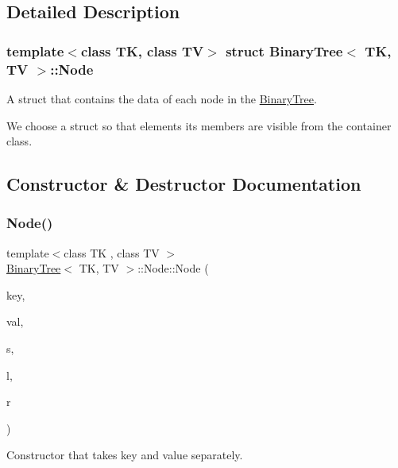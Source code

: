 \subsection{Detailed Description}
\subsubsection*{template$<$class TK, class TV$>$\newline
struct Binary\+Tree$<$ T\+K, T\+V $>$\+::\+Node}

A struct that contains the data of each node in the \mbox{\hyperlink{classBinaryTree}{Binary\+Tree}}. 

We choose a struct so that elements its members are visible from the container class. 

\subsection{Constructor \& Destructor Documentation}
\mbox{\label{structBinaryTree_1_1Node_aa1377acea199be263e4bbc0d7fda4eaa}} 
\subsubsection{\texorpdfstring{Node()}{Node()}\hspace{0.1cm}{\footnotesize\ttfamily [1/3]}}
{\footnotesize\ttfamily template$<$class TK , class TV $>$ \\
\mbox{\hyperlink{classBinaryTree}{Binary\+Tree}}$<$ TK, TV $>$\+::Node\+::\+Node (\begin{DoxyParamCaption}\item[{const TK \&}]{key,  }\item[{const TV \&}]{val,  }\item[{\mbox{\hyperlink{structBinaryTree_1_1Node}{Node}} $\ast$}]{s,  }\item[{\mbox{\hyperlink{structBinaryTree_1_1Node}{Node}} $\ast$}]{l,  }\item[{\mbox{\hyperlink{structBinaryTree_1_1Node}{Node}} $\ast$}]{r }\end{DoxyParamCaption})\hspace{0.3cm}{\ttfamily [inline]}}

Constructor that takes key and value separately. \mbox{\label{structBinaryTree_1_1Node_a6137917f379c2ed5b3a78d4d9da6ddf8}} 
